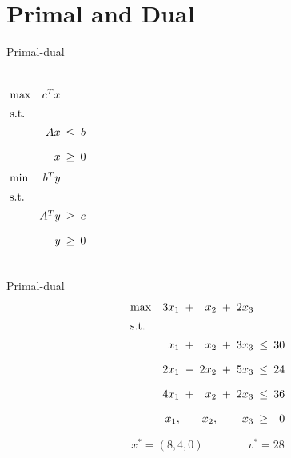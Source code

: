 \section{Primal and Dual}

\begin{frame}{Primal-dual}
  \begin{columns}
	  \begin{equation*}
		\setlength\arraycolsep{2.5pt}
		\begin{array}{l@{\quad}rcc}
		  \max 	& c^{T}x	&	&	\\[5pt]
		  \text{s.t.} 	&	&	&	\\[5pt]
				&	Ax 	&	\leq	&	b	\\[10pt]
				&	x	& 	\geq 	&	0	
		\end{array}
	  \end{equation*}
	  \begin{equation*}
		\setlength\arraycolsep{2.5pt}
		\begin{array}{l@{\quad}rcc}
		  \min 	& b^{T}y	&	&	\\[5pt]
		  \text{s.t.} 	&	&	&	\\[5pt]
				&	A^{T}y 	&	\geq	&	c	\\[10pt]
				&	y	& 	\geq 	&	0	
		\end{array}
	  \end{equation*}
  \end{columns}
\end{frame}
\begin{frame}{Primal-dual}
  \begin{equation*}
	\setlength\arraycolsep{2.5pt}
	\begin{array}{l@{\quad}rcrcrcr}
	  \max 	& 3x_1  &+&	x_2		&+&	2x_3	&	&	\\[5pt]
	  \text{s.t.} 	&	&	&	&	&	&	&	\\[5pt]
			& x_1   	&+&	x_2	&+&	3x_3	&\leq& 30 \\[10pt]
			& 2x_1	&-&	2x_2 	&+& 5x_3 	&\leq& 24 \\[10pt]
			& 4x_1   	&+&	x_2		&+&	2x_3	&\leq& 36	\\[10pt]
			& x_1,	&&	x_2,	&&	x_3	&\geq&	0
	\end{array}
  \end{equation*}

  \vspace{0.60cm}

  \[
	x^{\ast} = (8, 4, 0)	\qquad\qquad v^{\ast} = 28
  \]
\end{frame}
